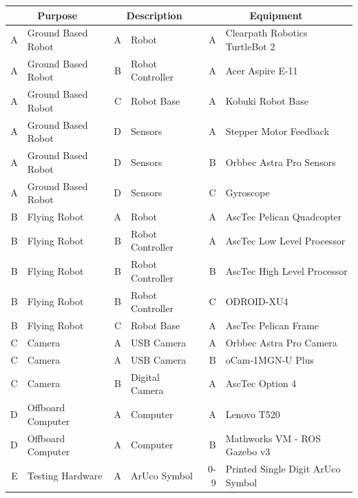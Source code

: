 \documentclass{article}[12]
\begin{document}
	\begin{table}
		\small
		\begin{tabular}{|rl|rl|rl|}
			\hline
			\multicolumn{2}{|c|}{\textbf{Purpose}} & \multicolumn{2}{c|}{\textbf{Description}} & \multicolumn{2}{c|}{\textbf{Equipment}} \\ \hline
			A & Ground Based Robot     & A & Robot              & A   & Clearpath Robotics TurtleBot 2    \\
			A & Ground Based Robot     & B & Robot Controller   & A   & Acer Aspire E-11                  \\
			A & Ground Based Robot     & C & Robot Base         & A   & Kobuki Robot Base                 \\
			A & Ground Based Robot     & D & Sensors            & A   & Stepper Motor Feedback            \\
			A & Ground Based Robot     & D & Sensors            & B   & Orbbec Astra Pro Sensors          \\
			A & Ground Based Robot     & D & Sensors            & C   & Gyroscope                         \\ \hline
			B & Flying Robot           & A & Robot              & A   & AscTec Pelican Quadcopter         \\
			B & Flying Robot           & B & Robot Controller   & A   & AscTec Low Level Processor        \\
			B & Flying Robot           & B & Robot Controller   & B   & AscTec High Level Processor       \\
			B & Flying Robot           & B & Robot Controller   & C   & ODROID-XU4                        \\
			B & Flying Robot           & C & Robot Base         & A   & AscTec Pelican Frame              \\ \hline
			C & Camera                 & A & USB Camera         & A   & Orbbec Astra Pro Camera           \\
			C & Camera                 & A & USB Camera         & B   & oCam-1MGN-U Plus                  \\
			C & Camera                 & B & Digital Camera     & A   & AscTec Option 4                   \\ \hline
			D & Offboard Computer      & A & Computer           & A   & Lenovo T520                       \\
			D & Offboard Computer      & A & Computer           & B   & Mathworks VM - ROS Gazebo v3      \\ \hline
			E & Testing Hardware       & A & ArUco Symbol       & 0-9 & Printed Single Digit ArUco Symbol \\

\end{tabular}
\end{table}
\end{document}
